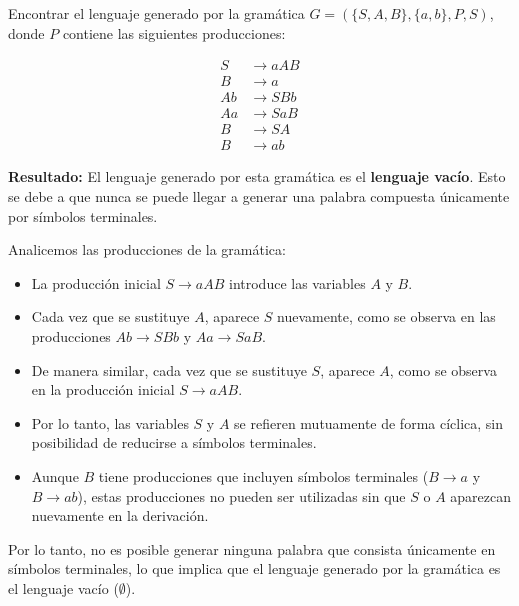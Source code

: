 \documentclass[12pt]{report} %
\begin{document}
\begin{ejercicioresuelto}
Encontrar el lenguaje generado por la gramática \( G = (\{S, A, B\}, \{a, b\}, P, S) \), donde \( P \) contiene las siguientes producciones:

\[
\begin{aligned}
    S &\to aAB \\
    B &\to a \\
    Ab &\to SBb \\
    Aa &\to SaB \\
    B &\to SA \\
    B &\to ab
\end{aligned}
\]

\textbf{Resultado:} El lenguaje generado por esta gramática es el \textbf{lenguaje vacío}. Esto se debe a que nunca se puede llegar a generar una palabra compuesta únicamente por símbolos terminales. 

\begin{demostracion}
Analicemos las producciones de la gramática:


\begin{itemize}
    \item La producción inicial \( S \to aAB \) introduce las variables \( A \) y \( B \).
    \item Cada vez que se sustituye \( A \), aparece \( S \) nuevamente, como se observa en las producciones \( Ab \to SBb \) y \( Aa \to SaB \).
    \item De manera similar, cada vez que se sustituye \( S \), aparece \( A \), como se observa en la producción inicial \( S \to aAB \).
    \item Por lo tanto, las variables \( S \) y \( A \) se refieren mutuamente de forma cíclica, sin posibilidad de reducirse a símbolos terminales.
    \item Aunque \( B \) tiene producciones que incluyen símbolos terminales (\( B \to a \) y \( B \to ab \)), estas producciones no pueden ser utilizadas sin que \( S \) o \( A \) aparezcan nuevamente en la derivación.
\end{itemize}

Por lo tanto, no es posible generar ninguna palabra que consista únicamente en símbolos terminales, lo que implica que el lenguaje generado por la gramática es el lenguaje vacío (\( \emptyset \)).
\end{demostracion}
\end{ejercicioresuelto}
\end{document}
